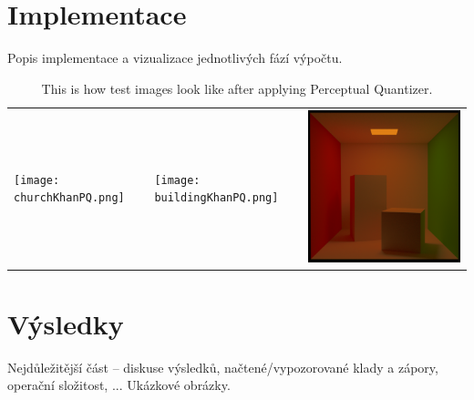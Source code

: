 \documentclass[11pt,a4paper,oneside]{article}
\begin{document}
\section{Implementace}
Popis implementace a vizualizace jednotlivých fází výpočtu.

\begin{table}[h]
    \centering
    \caption{This is how test images look like after applying Perceptual Quantizer.}
    \label{tab:method-pq}
    \begin{tabular}{lll}
        \texttt{[image: churchKhanPQ.png]} &
        \texttt{[image: buildingKhanPQ.png]} &
        \includegraphics[width=.3\linewidth,valign=m]{cornell_boxKhanPQ.png} \\
    \end{tabular}
\end{table}

\section{Výsledky}
Nejdůležitější část -- diskuse výsledků, 
načtené/vypozorované klady a zápory, operační složitost, ...
Ukázkové obrázky.
\end{document}
